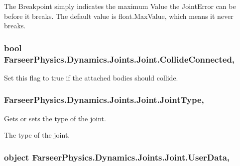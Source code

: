 The Breakpoint simply indicates the maximum Value the Joint\+Error can be before it breaks. The default value is float.\+Max\+Value, which means it never breaks. 

\hypertarget{class_farseer_physics_1_1_dynamics_1_1_joints_1_1_joint_a970d4f1d6bcf16af3c82ea97ebc1a966}{
\subsubsection[{Collide\+Connected}]{\setlength{\rightskip}{0pt plus 5cm}bool Farseer\+Physics.\+Dynamics.\+Joints.\+Joint.\+Collide\+Connected\hspace{0.3cm}{\ttfamily [get]}, {\ttfamily [set]}}}\label{class_farseer_physics_1_1_dynamics_1_1_joints_1_1_joint_a970d4f1d6bcf16af3c82ea97ebc1a966}


Set this flag to true if the attached bodies should collide. 

\hypertarget{class_farseer_physics_1_1_dynamics_1_1_joints_1_1_joint_acad2ef95a496b3c32b1ccec4f5cca2d5}{
\subsubsection[{Joint\+Type}]{ Farseer\+Physics.\+Dynamics.\+Joints.\+Joint.\+Joint\+Type\hspace{0.3cm}{\ttfamily [get]}, {}}}\label{class_farseer_physics_1_1_dynamics_1_1_joints_1_1_joint_acad2ef95a496b3c32b1ccec4f5cca2d5}


Gets or sets the type of the joint. 

The type of the joint.\hypertarget{class_farseer_physics_1_1_dynamics_1_1_joints_1_1_joint_a826db0676007538867698ed61ec24c65}{
\subsubsection[{User\+Data}]{\setlength{\rightskip}{0pt plus 5cm}object Farseer\+Physics.\+Dynamics.\+Joints.\+Joint.\+User\+Data\hspace{0.3cm}{\ttfamily [get]}, {\ttfamily [set]}}}\label{class_farseer_physics_1_1_dynamics_1_1_joints_1_1_joint_a826db0676007538867698ed61ec24c65}


